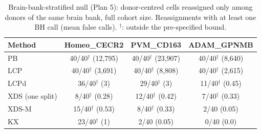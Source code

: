 \begin{table}[h]\centering\small\setlength{\tabcolsep}{4pt}
\caption{Brain-bank-stratified null (Plan 5): donor-centred cells reassigned only among donors of the same brain bank, full cohort size. Reassignments with at least one BH call (mean false calls). $^\dagger$: outside the pre-specified bound.}\label{tab:R2}
\begin{tabular}{lccc}\toprule Method & Homeo\_CECR2 & PVM\_CD163 & ADAM\_GPNMB\\\midrule
PB & 40/40$^\dagger$ (12{,}795) & 40/40$^\dagger$ (23{,}907) & 40/40$^\dagger$ (8{,}640)\\
LCP & 40/40$^\dagger$ (3{,}691) & 40/40$^\dagger$ (8{,}808) & 40/40$^\dagger$ (2{,}615)\\
LCPd & 36/40$^\dagger$ (3) & 29/40$^\dagger$ (3) & 11/40$^\dagger$ (0.45)\\
XDS (one split) & 8/40$^\dagger$ (0.28) & 12/40$^\dagger$ (0.42) & 7/40$^\dagger$ (0.33)\\
XDS-M & 15/40$^\dagger$ (0.53) & 8/40$^\dagger$ (0.33) & 2/40 (0.05)\\
KX & 23/40$^\dagger$ (1) & 2/40 (0.05) & 0/40 (0.0)\\
\bottomrule\end{tabular}\end{table}
